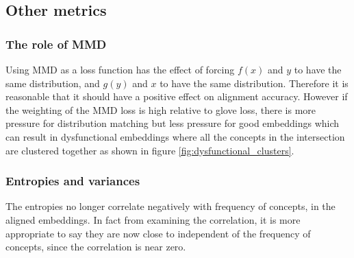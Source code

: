 \subsection{Other metrics}
\subsubsection{The role of MMD}

Using MMD as a loss function has the effect of forcing $f(x)$ and $y$ to have the same distribution, and  $g(y)$ and $x$ to have the same distribution. Therefore it is reasonable that it should have a positive effect on alignment accuracy. However if the weighting of the MMD loss is high relative to glove loss, there is more pressure for distribution  matching but less pressure for good embeddings which can result in dysfunctional embeddings where all the concepts in the intersection are clustered together as shown in figure \ref{fig:dysfunctional_clusters}. 

\subsubsection{Entropies and variances}

The entropies no longer correlate negatively with frequency of concepts, in the aligned embeddings. In fact from examining the correlation, it is more appropriate to say they are now close to independent of the frequency of concepts, since the correlation is near zero. 